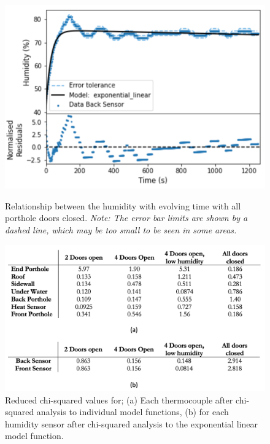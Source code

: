 \documentclass{article}
\begin{document}
\begin{figure}[H]
\centering
\begin{minipage}{.43\linewidth}
    \captionsetup{justification=centering,margin=0.5cm}
    \includegraphics[width=\textwidth]{Humidity increase.png}
    \caption{Relationship between the humidity with evolving time with all porthole doors closed. \textit{Note: The error bar limits are shown by a dashed line, which may be too small to be seen in some areas.}}
\end{minipage}
\hfill
\begin{minipage}{.56\linewidth}
    \captionsetup{justification=centering,margin=0.1cm}
    \includegraphics[width=\textwidth]{Air mode table.png}
    \caption{Reduced chi-squared values for; (a) Each thermocouple after chi-squared analysis to individual model functions, (b) for each humidity sensor after chi-squared analysis to the exponential linear model function.}
    \end{minipage}
\end{figure}
\end{document}
